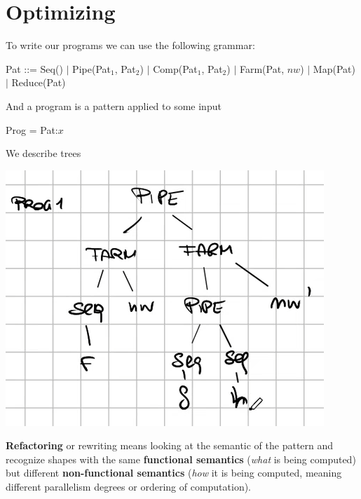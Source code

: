 \documentclass[10pt]{report}
\begin{document}
\section{Optimizing}
To write our programs we can use the following grammar:
\begin{center}
Pat ::= Seq() $|$ Pipe(Pat$_1$, Pat$_2$) $|$ Comp(Pat$_1$, Pat$_2$) $|$ Farm(Pat, $nw$) $|$ Map(Pat) $|$ Reduce(Pat)
\end{center}
And a program is a pattern applied to some input
\begin{center}
Prog = Pat:$x$
\end{center}
We describe trees
\begin{center}
	\includegraphics[scale=0.5]{34.png}
\end{center}
\textbf{Refactoring} or rewriting means looking at the semantic of the pattern and recognize shapes with the same \textbf{functional semantics} (\textit{what} is being computed) but different \textbf{non-functional semantics} (\textit{how} it is being computed, meaning different parallelism degrees or ordering of computation).
\end{document}
